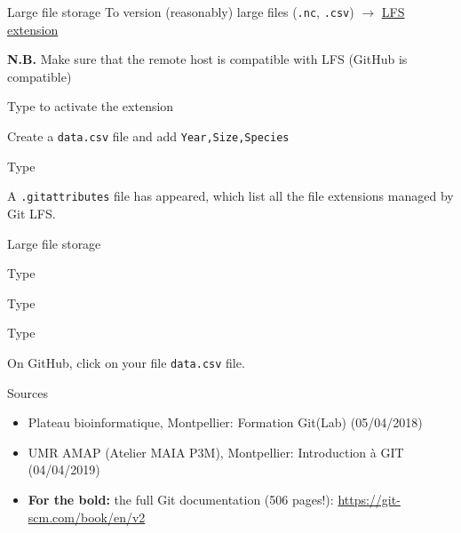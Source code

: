 \documentclass[10pt]{beamer}
\begin{document}
\begin{frame}[fragile]{Large file storage}
\protect\hypertarget{large-file-storage}{}
To version (reasonably) large files (\verb+.nc+, \verb+.csv+)
\(\rightarrow\) \href{https://git-lfs.github.com/}{LFS extension}


\textbf{N.B. }Make sure that the remote host is compatible with LFS (GitHub is
compatible)

Type  to activate the extension

Create a \texttt{data.csv} file and add \texttt{Year,Size,Species}

Type 


A \texttt{.gitattributes} file has appeared, which list all the file
extensions managed by Git LFS.
\end{frame}

\begin{frame}[fragile]{Large file storage}
\protect\hypertarget{large-file-storage-1}{}

Type 

Type 

Type 

On GitHub, click on your file \texttt{data.csv} file.

\end{frame}

\begin{frame}{Sources}
\protect\hypertarget{sources}{}
\begin{itemize}
\item
  Plateau bioinformatique, Montpellier: Formation Git(Lab) (05/04/2018)
\item
  UMR AMAP (Atelier MAIA P3M), Montpellier: Introduction à GIT
  (04/04/2019)
\item{\textbf{For the bold:} the full Git documentation (506 pages!): \url{https://git-scm.com/book/en/v2}}
\end{itemize}

\end{frame}
\end{document}
